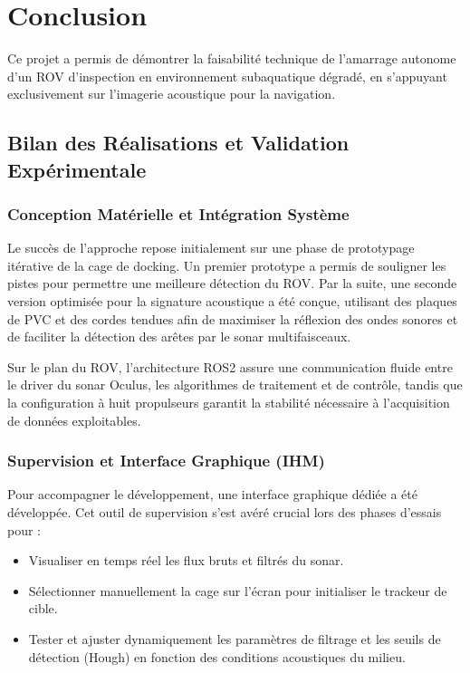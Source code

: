 \newpage
\chapter*{Conclusion}

Ce projet a permis de démontrer la faisabilité technique de l'amarrage autonome d'un ROV d'inspection en environnement subaquatique dégradé, en s'appuyant exclusivement sur l'imagerie acoustique pour la navigation.

\section{Bilan des Réalisations et Validation Expérimentale}

\subsection{Conception Matérielle et Intégration Système}

Le succès de l'approche repose initialement sur une phase de prototypage itérative de la cage de docking. Un premier prototype a permis de souligner les pistes pour permettre une meilleure détection du ROV. Par la suite, une seconde version optimisée pour la signature acoustique a été conçue, utilisant des plaques de PVC et des cordes tendues afin de maximiser la réflexion des ondes sonores et de faciliter la détection des arêtes par le sonar multifaisceaux.

Sur le plan du ROV, l'architecture ROS2 assure une communication fluide entre le driver du sonar Oculus, les algorithmes de traitement et de contrôle, tandis que la configuration à huit propulseurs garantit la stabilité nécessaire à l'acquisition de données exploitables.

\subsection{Supervision et Interface Graphique (IHM)}

Pour accompagner le développement, une interface graphique dédiée a été développée. Cet outil de supervision s'est avéré crucial lors des phases d'essais pour :
\begin{itemize}
    \item Visualiser en temps réel les flux bruts et filtrés du sonar.
    \item Sélectionner manuellement la cage sur l'écran pour initialiser le trackeur de cible.
    \item Tester et ajuster dynamiquement les paramètres de filtrage et les seuils de détection (Hough) en fonction des conditions acoustiques du milieu.
\end{itemize}

